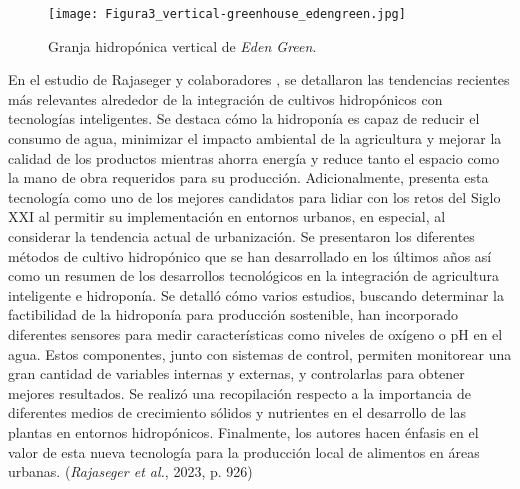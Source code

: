 \begin{figure}[H]
	\centering
	\texttt{[image: Figura3\_vertical-greenhouse\_edengreen.jpg]}
	\caption{Granja hidropónica vertical de \textit{Eden Green}. \cite{edengreen_10_nodate}}
	\label{fig:mesh2}
\end{figure}

En el estudio de Rajaseger y colaboradores \cite{rajaseger_hydroponics_2023}, se detallaron las tendencias recientes más relevantes alrededor de la integración de cultivos hidropónicos con tecnologías inteligentes. Se destaca cómo la hidroponía es capaz de reducir el consumo de agua, minimizar el impacto ambiental de la agricultura y mejorar la calidad de los productos mientras ahorra energía y reduce tanto el espacio como la mano de obra requeridos para su producción. Adicionalmente, presenta esta tecnología como uno de los mejores candidatos para lidiar con los retos del Siglo XXI al permitir su implementación en entornos urbanos, en especial, al considerar la tendencia actual de urbanización. Se presentaron los diferentes métodos de cultivo hidropónico que se han desarrollado en los últimos años así como un resumen de los desarrollos tecnológicos en la integración de agricultura inteligente e hidroponía. Se detalló cómo varios estudios, buscando determinar la factibilidad de la hidroponía para producción sostenible, han incorporado diferentes sensores para medir características como niveles de oxígeno o pH en el agua. Estos componentes, junto con sistemas de control, permiten monitorear una gran cantidad de variables internas y externas, y controlarlas para obtener mejores resultados. Se realizó una recopilación respecto a la importancia de diferentes medios de crecimiento sólidos y nutrientes en el desarrollo de las plantas en entornos hidropónicos. Finalmente, los autores hacen énfasis en el valor de esta nueva tecnología para la producción local de alimentos en áreas urbanas.  (\textit{Rajaseger et al.}, 2023, p. 926)

